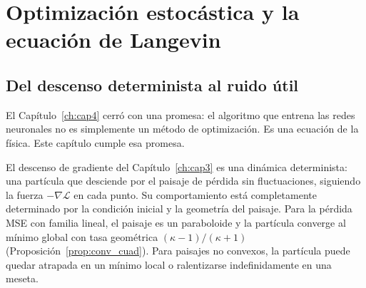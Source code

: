 
\chapter{Optimización estocástica y la ecuación de Langevin}
\label{ch:cap5}

\section{Del descenso determinista al ruido útil}
\label{sec:apertura5}


El Capítulo~\ref{ch:cap4} cerró con una promesa: el algoritmo que entrena
las redes neuronales no es simplemente un método de optimización. Es una
ecuación de la física. Este capítulo cumple esa promesa.

El descenso de gradiente del Capítulo~\ref{ch:cap3} es una dinámica
determinista: una partícula que desciende por el paisaje de pérdida sin
fluctuaciones, siguiendo la fuerza $-\nabla\mathcal{L}$ en cada punto. Su
comportamiento está completamente determinado por la condición inicial y la
geometría del paisaje. Para la pérdida MSE con familia lineal, el paisaje
es un paraboloide y la partícula converge al mínimo global con tasa
geométrica $(\kappa-1)/(\kappa+1)$ (Proposición~\ref{prop:conv_cuad}). Para
paisajes no convexos, la partícula puede quedar atrapada en un mínimo local
o ralentizarse indefinidamente en una meseta.

